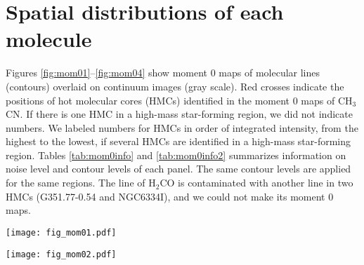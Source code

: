 \documentclass[twocolumn, twocolappendix]{aastex631}
\begin{document}

\appendix

\section{Spatial distributions of each molecule} \label{sec:a1}

Figures \ref{fig:mom01}--\ref{fig:mom04} show moment 0 maps of molecular lines (contours) overlaid on continuum images (gray scale).
Red crosses indicate the positions of hot molecular cores (HMCs) identified in the moment 0 maps of CH$_{3}$CN.
If there is one HMC in a high-mass star-forming region, we did not indicate numbers.
We labeled numbers for HMCs in order of integrated intensity, from the highest to the lowest, if several HMCs are identified in a high-mass star-forming region.
Tables \ref{tab:mom0info} and \ref{tab:mom0info2} summarizes information on noise level and contour levels of each panel.
The same contour levels are applied for the same regions.
The line of H$_{2}$CO is contaminated with another line in two HMCs (G351.77-0.54 and NGC6334I), and we could not make its moment 0 maps.
 
\begin{figure*}[!th]
 \begin{center}
  \texttt{[image: fig\_mom01.pdf]}
 \end{center}
\caption{Continuum images (gray scales) overlaid with contours indicating moment 0 maps of molecular lines (left panels: white; CH$_{3}$CN and cyan; H$_{2}$CO, right panels: magenta; NH$_{2}$CHO and yellow; HNCO). Red crosses indicate positions of hot molecular cores (HMCs). Information on noise levels and contour levels are summarized in Tables \ref{tab:mom0info} and \ref{tab:mom0info2}. \label{fig:mom01}}
\end{figure*}

\begin{figure*}[!th]
 \begin{center}
  \texttt{[image: fig\_mom02.pdf]}
 \end{center}
\caption{Continued.\label{fig:mom02}}
\end{figure*}
\end{document}
